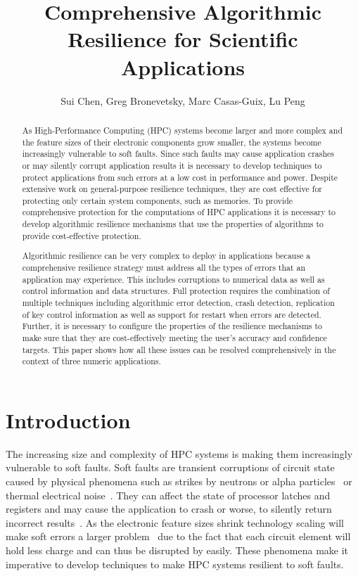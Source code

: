 \documentclass{sig-alternate}
\title{Comprehensive Algorithmic Resilience for Scientific Applications}
\author{Sui Chen,
Greg Bronevetsky, Marc Casas-Guix,
Lu Peng
}
\begin{document}
\maketitle

\begin{abstract}
As High-Performance Computing (HPC) systems become larger and more complex and the feature sizes of their electronic components grow smaller, the systems become increasingly vulnerable to soft faults.
Since such faults may cause application crashes or may silently corrupt application results it is necessary to develop techniques to protect applications from such errors at a low cost in performance and power.
Despite extensive work on general-purpose resilience techniques, they are cost effective for protecting only certain system components, such as memories.
To provide comprehensive protection for the computations of HPC applications it is necessary to develop algorithmic resilience mechanisms that use the properties of algorithms to provide cost-effective protection.

Algorithmic resilience can be very complex to deploy in applications because a comprehensive resilience strategy must address all the types of errors that an application may experience.
This includes corruptions to numerical data as well as control information and data structures.
Full protection requires the combination of multiple techniques including algorithmic error detection, crash detection, replication of key control information as well as support for restart when errors are detected.
Further, it is necessary to configure the properties of the resilience mechanisms to make sure that they are cost-effectively meeting the user's accuracy and confidence targets.
This paper shows how all these issues can be resolved comprehensively in the context of three numeric applications.

\end{abstract}

\section{Introduction}
\label{sec:intro}

The increasing size and complexity of HPC systems is making them increasingly vulnerable to soft faults.
Soft faults are transient corruptions of circuit state caused by physical phenomena such as strikes by neutrons or alpha particles~\cite{baumann:2005, asciQSER:2005} or thermal electrical noise~\cite{therm_noise:2007}.
They can affect the state of processor latches and registers and may cause the application to crash or worse, to silently return incorrect results~\cite{mpi_ser:reed:2004}.
As the electronic feature sizes shrink technology scaling will make soft errors a larger problem~\cite{err_scaling:2012} due to the fact that each circuit element will hold less charge and can thus be disrupted by easily.
These phenomena make it imperative to develop techniques to make HPC systems resilient to soft faults.
\end{document}
